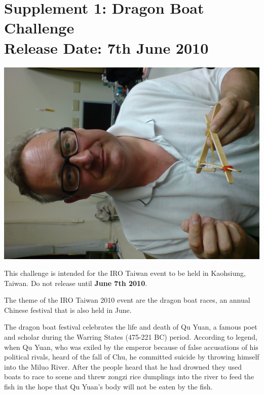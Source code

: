\documentclass[12pt]{hurocup}
\begin{document}
\newpage

\section{Supplement 1: Dragon Boat Challenge\\Release Date: 7th June 2010}
\label{sec:supp-dragaon-boat-challenge}

\begin{center}
 \includegraphics[width=0.7\linewidth]{Figures/junkyard_challenge_life3}
\end{center}

This challenge is intended for the IRO Taiwan event to be held in
Kaohsiung, Taiwan. Do not release until \textbf{June 7th 2010}.

The theme of the IRO Taiwan 2010 event are the dragon boat races, an
annual Chinese festival that is also held in June.

The dragon boat festival celebrates the life and death of Qu Yuan, a
famous poet and scholar during the Warring States (475-221 BC)
period. According to legend, when Qu Yuan, who was exiled by the
emperor because of false accusations of his political rivals, heard of
the fall of Chu, he committed suicide by throwing himself into the
Miluo River. After the people heard that he had drowned they used
boats to race to scene and threw zongzi rice dumplings into the river
to feed the fish in the hope that Qu Yuan's body will not be eaten by
the fish.

\label{dbc-field}
\end{document}
